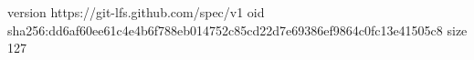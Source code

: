 version https://git-lfs.github.com/spec/v1
oid sha256:dd6af60ee61c4e4b6f788eb014752c85cd22d7e69386ef9864c0fc13e41505c8
size 127
